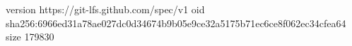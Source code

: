 version https://git-lfs.github.com/spec/v1
oid sha256:6966ed31a78ae027dc0d34674b9b05e9ce32a5175b71ec6ce8f062ec34cfea64
size 179830
